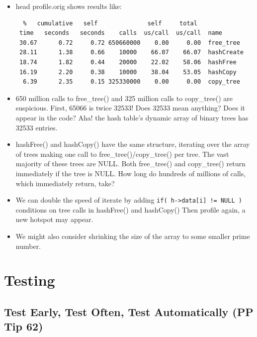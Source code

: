 \documentclass[handout]{beamer}
\newcommand{\pitem}{\pause \item}
\begin{document}
\begin{frame}[fragile]
    \begin{itemize}
    \item
      \alert{head profile.orig} shows results like:
\small
\begin{verbatim}
  %   cumulative   self              self     total           
 time   seconds   seconds    calls  us/call  us/call  name    
 30.67      0.72     0.72 650660000    0.00     0.00  free_tree
 28.11      1.38     0.66    10000    66.07    66.07  hashCreate
 18.74      1.82     0.44    20000    22.02    58.06  hashFree
 16.19      2.20     0.38    10000    38.04    53.05  hashCopy
  6.39      2.35     0.15 325330000    0.00     0.00  copy_tree
\end{verbatim}
    \pitem
    650 million calls to \alert{free\_tree()} and
    325 million calls to \alert{copy\_tree()} are suspicious.
    First, 65066 is twice 32533!
    Does 32533 mean anything?  Does it appear in the code?
    \pause
    Aha! the hash table's \alert{dynamic array of binary trees}
    has 32533 entries.
    \pitem
    \alert{hashFree()} and \alert{hashCopy()} have the same
    structure, iterating over the array of trees
    making one call to \alert{free\_tree()/copy\_tree()} per tree.
    The \alert{vast majority} of these trees are \alert{NULL}.
    Both \alert{free\_tree()} and \alert{copy\_tree()} return immediately
    if the tree is NULL.
    \pause
    How long do hundreds of millions of calls, which immediately return, take?

    \pitem
    We can \alert{double the speed} of \alert{iterate} by adding
    \verb+if( h->data[i] != NULL )+ conditions on tree calls
    in \alert{hashFree()} and \alert{hashCopy()}
    \pause
    Then profile again, a new hotspot may appear.
    \pitem
    We might also consider \alert{shrinking the size of the array}
    to some smaller prime number.
    \end{itemize}
\end{frame}

\section{Testing}
\subsection{Test Early, Test Often, Test Automatically (PP Tip 62)}
\end{document}
